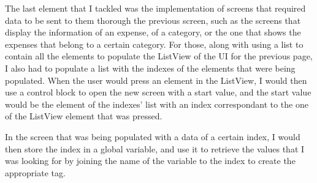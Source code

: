 The last element that I tackled was the implementation of screens that required data to be sent to them thorough the previous screen, such as the screens that display the information of an expense, of a category, or the one that shows the expenses that belong to a certain category. For those, along with using a list to contain all the elements to populate the ListView of the UI for the previous page, I also had to populate a list with the indexes of the elements that were being populated. When the user would press an element in the ListView, I would then use a control block to open the new screen with a start value, and the start value would be the element of the indexes' list with an index correspondant to the one of the ListView element that was pressed.

In the screen that was being populated with a data of a certain index, I would then store the index in a global variable, and use it to retrieve the values that I was looking for by joining the name of the variable to the index to create the appropriate tag.
